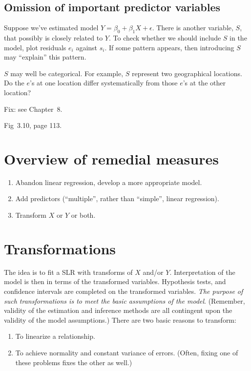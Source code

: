 \documentclass[12pt]{article}
\begin{document}
\subsection{Omission of important predictor variables}

Suppose we've estimated model $Y = \beta_0 + \beta_1 X + \epsilon$.
There is another variable, $S$, that possibly is closely related to
$Y$. To check whether we should include $S$ in the model,
plot residuals $e_i$ against $s_i$.
If some pattern appears, then introducing $S$ may ``explain'' this
pattern.

$S$ may well be categorical.
For example, $S$ represent two geographical locations.
Do the $e$'s at one location differ systematically from
those $e$'s at the other location?

Fix: see Chapter~8.

\example
Fig~3.10, page 113.


\section{Overview of remedial measures}

\begin{enumerate}
\item Abandon linear regression, develop a more appropriate model.

\item Add predictors (``multiple'', rather than ``simple'', linear
regression).

\item Transform $X$ or $Y$ or both.
\end{enumerate}


\section{Transformations}

The idea is to fit a SLR with transforms of $X$ and/or $Y$.
Interpretation of the model is then in terms of the transformed variables.
Hypothesis tests, and confidence intervals are completed
on the transformed variables.
\emph{The purpose of such transformations is to meet the
basic assumptions of the model}.
(Remember, validity of the estimation and inference methods are all
contingent upon the validity of the model assumptions.)
There are two basic reasons to
transform:

\begin{enumerate}
\item
To linearize a relationship.

\item
To achieve normality and constant variance  of errors.
(Often, fixing
one of these problems fixes the other as well.)
\end{enumerate}
\end{document}
